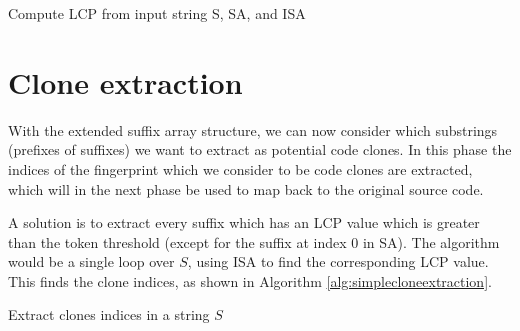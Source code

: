 \begin{algorithm}[htp]
  \SetAlgoLined\DontPrintSemicolon

  \vspace{0.5cm}
  \caption{Compute LCP from input string S, SA, and ISA}
  \label{alg:lcp}
\end{algorithm}


\section{Clone extraction}

With the extended suffix array structure, we can now consider which substrings (prefixes
of suffixes) we want to extract as potential code clones. In this phase the indices of the
fingerprint which we consider to be code clones are extracted, which will in the next
phase be used to map back to the original source code.

A solution is to extract every suffix which has an LCP value which is greater than the
token threshold (except for the suffix at index 0 in SA). The algorithm would be a single
loop over $S$, using ISA to find the corresponding LCP value. This
finds the clone indices, as shown in Algorithm \ref{alg:simplecloneextraction}.

\begin{algorithm}[htp]
  \SetAlgoLined\DontPrintSemicolon

  \vspace{0.5cm}
  \caption{Extract clones indices in a string $S$}
  \label{alg:simplecloneextraction}
\end{algorithm}


